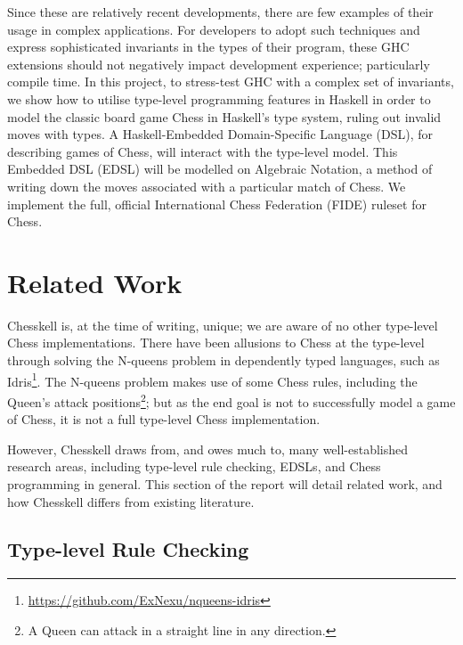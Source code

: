 Since these are relatively recent developments, there are few examples of their usage in complex applications. For developers to adopt such techniques and express sophisticated invariants in the types of their program, these GHC extensions should not negatively impact development experience; particularly compile time. In this project, to stress-test GHC with a complex set of invariants, we show how to utilise type-level programming features in Haskell in order to model the classic board game Chess in Haskell's type system, ruling out invalid moves with types. A Haskell-Embedded Domain-Specific Language (DSL), for describing games of Chess, will interact with the type-level model. This Embedded DSL (EDSL) will be modelled on Algebraic Notation, a method of writing down the moves associated with a particular match of Chess. We implement the full, official International Chess Federation (FIDE) ruleset for Chess.

\section{Related Work}

Chesskell is, at the time of writing, unique; we are aware of no other type-level Chess implementations. There have been allusions to Chess at the type-level through solving the N-queens problem in dependently typed languages, such as Idris\footnote{\url{https://github.com/ExNexu/nqueens-idris}}. The N-queens problem makes use of some Chess rules, including the Queen's attack positions\footnote{A Queen can attack in a straight line in any direction.}; but as the end goal is not to successfully model a game of Chess, it is not a full type-level Chess implementation.

However, Chesskell draws from, and owes much to, many well-established research areas, including type-level rule checking, EDSLs, and Chess programming in general. This section of the report will detail related work, and how Chesskell differs from existing literature.

\subsection{Type-level Rule Checking}

